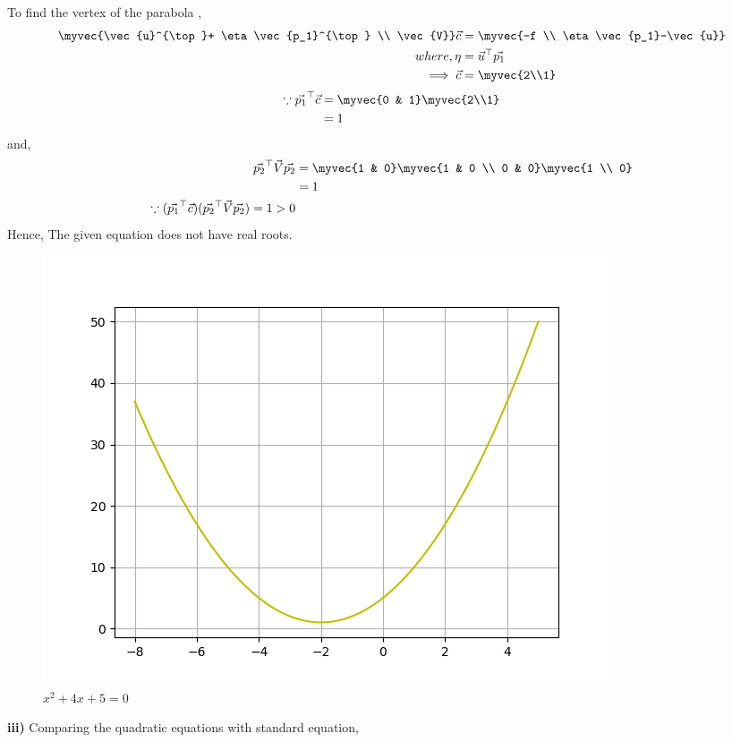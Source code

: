 To find the vertex of the parabola ,
\begin{align}
    \myvec{\vec{u}^{\top}+ \eta \vec{p_1}^{\top} \\ \vec{V}}\vec{c} &= \myvec{-f \\ \eta \vec{p_1}-\vec{u}}\\
    where, \eta &= \vec{u}^{\top}\vec{p_1}\\
    \implies
    \vec{c}&=\myvec{2\\1}
\end{align}
\begin{align}
    \because \vec{p_1}^{\top}\vec{c} &= \myvec{0 & 1}\myvec{2\\1} \\
    &= 1
\end{align}
and,
\begin{align}
    \vec{p_2}^{\top}\vec{V}\vec{p_2}&= \myvec{1 & 0}\myvec{1 & 0 \\ 0 & 0}\myvec{1 \\ 0}\\
    &= 1\\
    \because (\vec{p_1}^{\top}\vec{c}) (\vec{p_2}^{\top}\vec{V}\vec{p_2})=1>0 
\end{align}
Hence, The given equation does not have real roots.\\
\begin{figure}[htp]
    \centering
    \includegraphics[width=\columnwidth]{solutions/oct/2/21/Figures/Figure_2.png}
    \caption{$x^2+4x+5=0$}
    \label{oct/2/21/fig:my_label}
\end{figure}
\textbf{iii)}
Comparing the quadratic equations with standard equation,
